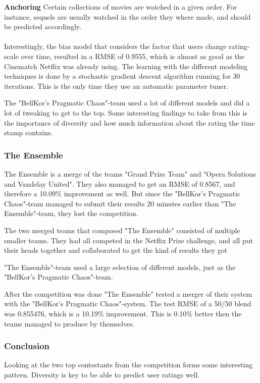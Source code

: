 \textbf{Anchoring}  Certain collections of movies are watched in a given order. For instance, sequels are usually watched in the order they where made, and should be predicted accordingly. \\\\


Interestingly, the bias model that considers the factor that users change rating-scale over time, resulted in a RMSE of 0.9555, which is almost as good as the Cinematch Netflix was already using. The learning with the different modeling techniques is done by a stochastic gradient descent algorithm running for 30 iterations. This is the only time they use an automatic parameter tuner. \cite{BellKor-2008-sol}

The "BellKor's Pragmatic Chaos"-team used a lot of different models and did a lot of tweaking to get to the top. Some interesting findings to take from this is the importance of diversity and how much information about the rating the time stamp contains.

\subsubsection{The Ensemble}
The Ensemble is a merge of the teams "Grand Prize Team" and "Opera Solutions and Vandelay United". They also managed to get an RMSE of 0.8567, and therefore a 10.09\% improvement as well. But since the "BellKor's Pragmatic Chaos"-team managed to submit their results 20 minutes earlier than "The Ensemble"-team, they lost the competition.

The two merged teams that composed "The Ensemble" consisted of multiple smaller teams. They had all competed in the Netflix Prize challenge, and all put their heads together and collaborated to get the kind of results they got

"The Ensemble"-team used a large selection of different models, just as the "BellKor's Pragmatic Chaos"-team.

After the competition was done "The Ensemble" tested a merger of their system with the "BellKor's Pragmatic Chaos"-system. The test RMSE of a 50/50 blend was 0.855476, which is a 10.19\% improvement. This is 0.10\% better then the teams managed to produce by themselves.

\subsubsection{Conclusion}
Looking at the two top contestants from the competition forms some interesting pattern. Diversity is key to be able to predict user ratings well.

